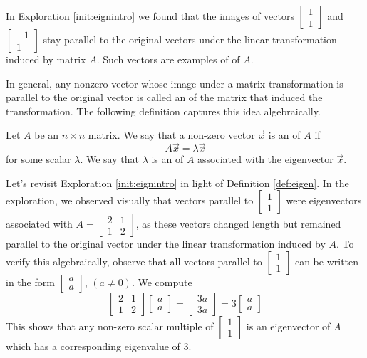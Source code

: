 \documentclass{ximera}
\begin{document}
In Exploration \ref{init:eignintro} we found that the images of vectors $\begin{bmatrix}1\\1\end{bmatrix}$ and $\begin{bmatrix}-1\\1\end{bmatrix}$ stay parallel to the original vectors under the linear transformation induced by matrix $A$.  Such vectors are examples of  of $A$. 

In general, any nonzero vector whose image under a matrix transformation is parallel to the original vector is called an  of the matrix that induced the transformation.  The following definition captures this idea algebraically.

\begin{definition}\label{def:eigen}
Let $A$ be an $n \times n$ matrix.  We say that a non-zero vector $\vec{x}$ is an  of $A$ if $$A\vec{x} = \lambda \vec{x}$$
for some scalar $\lambda$.
We say that $\lambda$ is an  of $A$ associated with the eigenvector $\vec{x}$. %
\end{definition}

Let's revisit Exploration \ref{init:eignintro} in light of Definition \ref{def:eigen}.  In the exploration, we observed visually that vectors parallel to $\begin{bmatrix} 1\\ 1 \end{bmatrix}$ were eigenvectors associated with $A=\begin{bmatrix} 2& 1\\ 1&2
\end{bmatrix}$, as these vectors changed length but remained parallel to the original vector under the linear transformation induced by $A$.  To verify this algebraically, observe that all vectors parallel to $\begin{bmatrix} 1\\ 1 \end{bmatrix}$ can be written in the form $\begin{bmatrix} a\\ a \end{bmatrix}$, $(a\neq 0)$.  We compute 
$$\begin{bmatrix} 2& 1\\ 1&2 \end{bmatrix} \begin{bmatrix} a\\ a \end{bmatrix} =
\begin{bmatrix} 3a\\ 3a \end{bmatrix}= 3 \begin{bmatrix} a\\ a \end{bmatrix}$$
This shows that any non-zero scalar multiple of $\begin{bmatrix} 1\\ 1 \end{bmatrix}$ is an eigenvector of $A$ which has a corresponding eigenvalue of 3.
\end{document}
